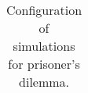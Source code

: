 \documentclass{book}
\begin{document}
\begin{table}[H]
\begin{center}
\begin{tabular}{|c|c|c|c|c|c|c|}
\end{tabular}
\end{center}
\caption{Configuration of simulations for prisoner's dilemma.}
\label{tab:simcombtag}
\end{table}




\newpage


\end{document}
